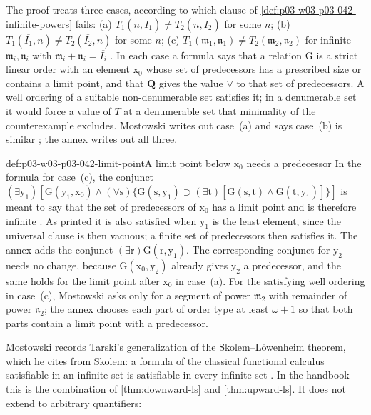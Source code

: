 The proof treats three cases, according to which clause of
\cref{def:p03-w03-p03-042-infinite-powers} fails: (a) \(T_1(n,
\overline{I_1})\neq T_2(n,\overline{I_2})\) for some \(n\); (b)
\(T_1(\overline{I_1},n)\neq T_2(\overline{I_2},n)\) for some \(n\);
(c) \(T_1(\mathfrak m_1,\mathfrak n_1)\neq T_2(\mathfrak m_2,\mathfrak
n_2)\) for infinite \(\mathfrak m_i,\mathfrak n_i\) with \(\mathfrak
m_i+\mathfrak n_i=\overline{I_i}\) \cite[p.~24]{Mostowski1957}.  In each
case a formula says that a relation \(\mathrm G\) is a strict linear order
with an element \(\mathrm x_0\) whose set of predecessors has a prescribed
size or contains a limit point, and that \(\mathbf Q\) gives the value
\(\vee\) to that set of predecessors.  A well ordering of a suitable
non-denumerable set satisfies it; in a denumerable set it would force a
value of \(T\) at a denumerable set that minimality of the counterexample
excludes.  Mostowski writes out case~(a) and says case~(b) is similar
\cite[p.~25]{Mostowski1957}; the annex writes out all three.

\begin{hbwarning}{def:p03-w03-p03-042-limit-point}{A limit point below \(\mathrm x_0\) needs a predecessor}
In the formula for case~(c), the conjunct
\((\exists\mathrm y_1)[\mathrm G(\mathrm y_1,\mathrm x_0)\wedge(\forall
\mathrm s)\{\mathrm G(\mathrm s,\mathrm y_1)\supset(\exists\mathrm t)
[\mathrm G(\mathrm s,\mathrm t)\wedge\mathrm G(\mathrm t,\mathrm y_1)]\}]\)
is meant to say that the set of predecessors of \(\mathrm x_0\) has a
limit point and is therefore infinite \cite[p.~25]{Mostowski1957}.  As
printed it is also satisfied when \(\mathrm y_1\) is the least element,
since the universal clause is then vacuous; a finite set of predecessors
then satisfies it.  The annex adds the conjunct \((\exists\mathrm r)
\mathrm G(\mathrm r,\mathrm y_1)\).  The corresponding conjunct for
\(\mathrm y_2\) needs no change, because \(\mathrm G(\mathrm x_0,\mathrm
y_2)\) already gives \(\mathrm y_2\) a predecessor, and the same holds for
the limit point after \(\mathrm x_0\) in case~(a).  For the satisfying
well ordering in case~(c), Mostowski asks only for a segment of power
\(\mathfrak m_2\) with remainder of power \(\mathfrak n_2\); the annex
chooses each part of order type at least \(\omega+1\) so that both parts
contain a limit point with a predecessor.
\end{hbwarning}

Mostowski records Tarski's generalization of the Skolem--L\"owenheim
theorem, which he cites from Skolem: a formula of the classical functional
calculus satisfiable in an infinite set is satisfiable in every infinite
set \cite[p.~25]{Mostowski1957}.  In the handbook this is the combination
of \cref{thm:downward-ls} and \cref{thm:upward-ls}.  It does not extend to
arbitrary quantifiers:

